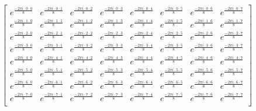 \documentclass[11pt, spanish]{article}
\begin{document}
\[
\begin{bmatrix}
e^{\frac{-2 \pi i \cdot 0 \cdot 0}{8}} & e^{\frac{-2 \pi i \cdot 0 \cdot 1}{8}} & e^{\frac{-2 \pi i \cdot0 \cdot 2}{8}}
& e^{\frac{-2 \pi i \cdot 0 \cdot 3}{8}} & e^{\frac{-2 \pi i \cdot 0 \cdot 4}{8}} & e^{\frac{-2 \pi i \cdot 0 \cdot
5}{8}} & e^{\frac{-2 \pi i \cdot 0 \cdot 6}{8}} & e^{\frac{-2 \pi i \cdot 0 \cdot 7}{8}} \\
e^{\frac{-2 \pi i \cdot 1 \cdot 0}{8}} & e^{\frac{-2 \pi i \cdot 1 \cdot 1}{8}} & e^{\frac{-2 \pi i \cdot1 \cdot 2}{8}}
& e^{\frac{-2 \pi i \cdot 1 \cdot 3}{8}} & e^{\frac{-2 \pi i \cdot 1 \cdot 4}{8}} & e^{\frac{-2 \pi i \cdot 1 \cdot
5}{8}} & e^{\frac{-2 \pi i \cdot 1 \cdot 6}{8}} & e^{\frac{-2 \pi i \cdot 1 \cdot 7}{8}} \\
e^{\frac{-2 \pi i \cdot 2 \cdot 0}{8}} & e^{\frac{-2 \pi i \cdot 2 \cdot 1}{8}} & e^{\frac{-2 \pi i \cdot2 \cdot 2}{8}}
& e^{\frac{-2 \pi i \cdot 2 \cdot 3}{8}} & e^{\frac{-2 \pi i \cdot 2 \cdot 4}{8}} & e^{\frac{-2 \pi i \cdot 2 \cdot
5}{8}} & e^{\frac{-2 \pi i \cdot 2 \cdot 6}{8}} & e^{\frac{-2 \pi i \cdot 2 \cdot 7}{8}} \\
e^{\frac{-2 \pi i \cdot 3 \cdot 0}{8}} & e^{\frac{-2 \pi i \cdot 3 \cdot 1}{8}} & e^{\frac{-2 \pi i \cdot3 \cdot 2}{8}}
& e^{\frac{-2 \pi i \cdot 3 \cdot 3}{8}} & e^{\frac{-2 \pi i \cdot 3 \cdot 4}{8}} & e^{\frac{-2 \pi i \cdot 3 \cdot
5}{8}} & e^{\frac{-2 \pi i \cdot 3 \cdot 6}{8}} & e^{\frac{-2 \pi i \cdot 3 \cdot 7}{8}} \\
e^{\frac{-2 \pi i \cdot 4 \cdot 0}{8}} & e^{\frac{-2 \pi i \cdot 4 \cdot 1}{8}} & e^{\frac{-2 \pi i \cdot4 \cdot 2}{8}}
& e^{\frac{-2 \pi i \cdot 4 \cdot 3}{8}} & e^{\frac{-2 \pi i \cdot 4 \cdot 4}{8}} & e^{\frac{-2 \pi i \cdot 4 \cdot
5}{8}} & e^{\frac{-2 \pi i \cdot 4 \cdot 6}{8}} & e^{\frac{-2 \pi i \cdot 4 \cdot 7}{8}} \\
e^{\frac{-2 \pi i \cdot 5 \cdot 0}{8}} & e^{\frac{-2 \pi i \cdot 5 \cdot 1}{8}} & e^{\frac{-2 \pi i \cdot5 \cdot 2}{8}}
& e^{\frac{-2 \pi i \cdot 5 \cdot 3}{8}} & e^{\frac{-2 \pi i \cdot 5 \cdot 4}{8}} & e^{\frac{-2 \pi i \cdot 5 \cdot
5}{8}} & e^{\frac{-2 \pi i \cdot 5 \cdot 6}{8}} & e^{\frac{-2 \pi i \cdot 5 \cdot 7}{8}} \\
e^{\frac{-2 \pi i \cdot 6 \cdot 0}{8}} & e^{\frac{-2 \pi i \cdot 6 \cdot 1}{8}} & e^{\frac{-2 \pi i \cdot6 \cdot 2}{8}}
& e^{\frac{-2 \pi i \cdot 6 \cdot 3}{8}} & e^{\frac{-2 \pi i \cdot 6 \cdot 4}{8}} & e^{\frac{-2 \pi i \cdot 6 \cdot
5}{8}} & e^{\frac{-2 \pi i \cdot 6 \cdot 6}{8}} & e^{\frac{-2 \pi i \cdot 6 \cdot 7}{8}} \\
e^{\frac{-2 \pi i \cdot 7 \cdot 0}{8}} & e^{\frac{-2 \pi i \cdot 7 \cdot 1}{8}} & e^{\frac{-2 \pi i \cdot7 \cdot 2}{8}}
& e^{\frac{-2 \pi i \cdot 7 \cdot 3}{8}} & e^{\frac{-2 \pi i \cdot 7 \cdot 4}{8}} & e^{\frac{-2 \pi i \cdot 7 \cdot
5}{8}} & e^{\frac{-2 \pi i \cdot 7 \cdot 6}{8}} & e^{\frac{-2 \pi i \cdot 7 \cdot 7}{8}} \\
\end{bmatrix}
\]
\end{document}
